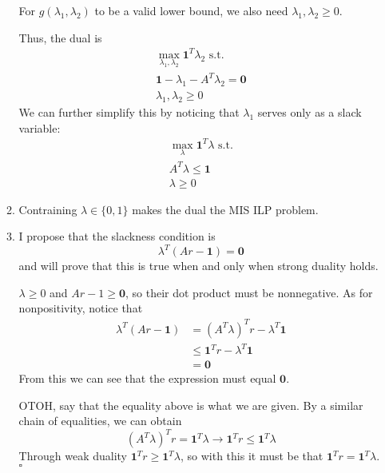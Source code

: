 \documentclass[12pt]{article}
\begin{document}
\begin{enumerate}
\begin{enumerate}
                        For $g(\lambda_1, \lambda_2)$ to be a valid lower bound,
                        we also need $\lambda_1, \lambda_2 \ge 0$.

                        Thus, the dual is
                        \begin{gather*}
                              \max_{\lambda_1, \lambda_2} \mathbf{1}^T\lambda_2\text{ s.t.} \\
                              \mathbf{1}-\lambda_1-A^T\lambda_2=\mathbf{0} \\
                              \lambda_1, \lambda_2 \ge 0
                        \end{gather*}
                        We can further simplify this by noticing that $\lambda_1$ serves only as a slack variable:
                        \begin{gather*}
                              \max_{\lambda} \mathbf{1}^T\lambda\text{ s.t.} \\
                              A^T\lambda \le \mathbf{1} \\
                              \lambda \ge 0
                        \end{gather*}
                  \item Contraining $\lambda \in \{0, 1\}$ makes the dual the MIS ILP problem.
                  \item I propose that the slackness condition is
                  \[\boxed{\lambda^T(Ar-\mathbf{1})=\mathbf{0}}\]
                  and will prove that this is true when and only when strong duality holds.

                  $\lambda \ge 0$ and $Ar-1 \ge \mathbf{0}$, so their dot product must be nonnegative.
                  As for nonpositivity, notice that
                  \begin{align*}
                        \lambda^T(Ar-\mathbf{1})
                        &= (A^T\lambda)^Tr-\lambda^T\mathbf{1} \\
                        &\le \mathbf{1}^Tr-\lambda^T\mathbf{1} \\
                        &= \mathbf{0}
                  \end{align*}
                  From this we can see that the expression must equal $\mathbf{0}$.

                  OTOH, say that the equality above is what we are given.
                  By a similar chain of equalities, we can obtain
                  \[(A^T\lambda)^Tr=\mathbf{1}^T\lambda \rightarrow \mathbf{1}^Tr \le \mathbf{1}^T\lambda\]
                  Through weak duality $\mathbf{1}^Tr \ge \mathbf{1}^T\lambda$, so
                  with this it must be that $\mathbf{1}^Tr=\mathbf{1}^T\lambda$. $\square$


\end{enumerate}
\end{enumerate}
\end{document}
